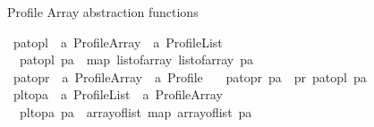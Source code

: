 \begin{isabellebody}
%
\endisatagproof
{\isafoldproof}%
%
\isadelimproof
%
\endisadelimproof
%
\begin{isamarkuptext}%
Profile Array abstraction functions%
\end{isamarkuptext}\isamarkuptrue%
\isamarkupfalse%
\ pa{\isacharunderscore}{\kern0pt}to{\isacharunderscore}{\kern0pt}pl\ {\isacharcolon}{\kern0pt}{\isacharcolon}{\kern0pt}\ {\isachardoublequoteopen}{\isacharprime}{\kern0pt}a\ Profile{\isacharunderscore}{\kern0pt}Array\ {\isasymRightarrow}\ {\isacharprime}{\kern0pt}a\ Profile{\isacharunderscore}{\kern0pt}List{\isachardoublequoteclose}\ \isanewline
\ \ {\isachardoublequoteopen}pa{\isacharunderscore}{\kern0pt}to{\isacharunderscore}{\kern0pt}pl\ pa\ {\isacharequal}{\kern0pt}\ map\ {\isacharparenleft}{\kern0pt}list{\isacharunderscore}{\kern0pt}of{\isacharunderscore}{\kern0pt}array{\isacharparenright}{\kern0pt}\ {\isacharparenleft}{\kern0pt}list{\isacharunderscore}{\kern0pt}of{\isacharunderscore}{\kern0pt}array\ pa{\isacharparenright}{\kern0pt}{\isachardoublequoteclose}\isanewline
\isanewline
{}\isamarkupfalse%
\ pa{\isacharunderscore}{\kern0pt}to{\isacharunderscore}{\kern0pt}pr\ {\isacharcolon}{\kern0pt}{\isacharcolon}{\kern0pt}\ {\isachardoublequoteopen}{\isacharprime}{\kern0pt}a\ Profile{\isacharunderscore}{\kern0pt}Array\ {\isasymRightarrow}\ {\isacharprime}{\kern0pt}a\ Profile{\isachardoublequoteclose}\ \isanewline
\ \ {\isachardoublequoteopen}pa{\isacharunderscore}{\kern0pt}to{\isacharunderscore}{\kern0pt}pr\ pa\ {\isacharequal}{\kern0pt}\ pr{}{\isacharunderscore}{\kern0pt}{\isasymalpha}\ {\isacharparenleft}{\kern0pt}pa{\isacharunderscore}{\kern0pt}to{\isacharunderscore}{\kern0pt}pl\ pa{\isacharparenright}{\kern0pt}{\isachardoublequoteclose}\isanewline
\isanewline
{}\isamarkupfalse%
\ pl{\isacharunderscore}{\kern0pt}to{\isacharunderscore}{\kern0pt}pa\ {\isacharcolon}{\kern0pt}{\isacharcolon}{\kern0pt}\ {\isachardoublequoteopen}{\isacharprime}{\kern0pt}a\ Profile{\isacharunderscore}{\kern0pt}List\ {\isasymRightarrow}\ {\isacharprime}{\kern0pt}a\ Profile{\isacharunderscore}{\kern0pt}Array{\isachardoublequoteclose}\ \isanewline
\ \ {\isachardoublequoteopen}pl{\isacharunderscore}{\kern0pt}to{\isacharunderscore}{\kern0pt}pa\ pa\ {\isacharequal}{\kern0pt}\ array{\isacharunderscore}{\kern0pt}of{\isacharunderscore}{\kern0pt}list\ {\isacharparenleft}{\kern0pt}map\ {\isacharparenleft}{\kern0pt}array{\isacharunderscore}{\kern0pt}of{\isacharunderscore}{\kern0pt}list{\isacharparenright}{\kern0pt}\ {\isacharparenleft}{\kern0pt}pa{\isacharparenright}{\kern0pt}{\isacharparenright}{\kern0pt}{\isachardoublequoteclose}%

\end{isabellebody}
